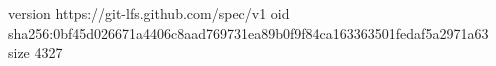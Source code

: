 version https://git-lfs.github.com/spec/v1
oid sha256:0bf45d026671a4406c8aad769731ea89b0f9f84ca163363501fedaf5a2971a63
size 4327
